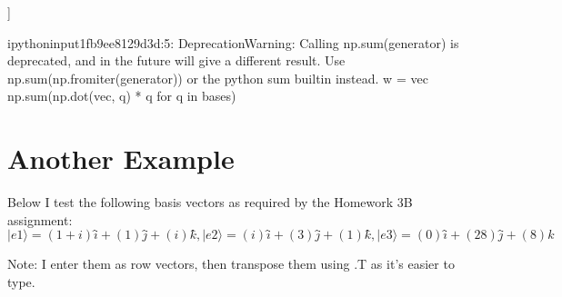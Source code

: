 \documentclass[letterpaper,10pt,english]{jupyterBook}
\begin{document}
\begin{sphinxVerbatim}[commandchars=\\\{\}]
  \PYG{p}{[}
    \PYG{p}{[}  \PYG{p}{]}
    \PYG{p}{[}  \PYG{p}{]}
    \PYG{p}{[}  \PYG{p}{]}
\PYG{p}{]}

\end{sphinxVerbatim}

\begin{sphinxVerbatim}[commandchars=\\\{\}]
[[0.57735027+0.57735027j 0.        +0.57735027j 0.        +0.j        ]
 [0.0702873 \PYGZhy{}0.05857275j 0.15228915\PYGZhy{}0.01171455j 0.98402221+0.j        ]
 [0.31547059+0.83647199j 0.32032088+0.30859935j 0.03395199\PYGZhy{}0.04243999j]]
\end{sphinxVerbatim}

\begin{sphinxVerbatim}[commandchars=\\\{\}]
\PYGZlt{}ipython\PYGZhy{}input\PYGZhy{}1\PYGZhy{}fb9ee8129d3d\PYGZgt{}:5: DeprecationWarning: Calling np.sum(generator) is deprecated, and in the future will give a different result. Use np.sum(np.fromiter(generator)) or the python sum builtin instead.
  w = vec \PYGZhy{} np.sum(np.dot(vec, q) * q for q in bases)
\end{sphinxVerbatim}


\chapter{Another Example}
\label{\detokenize{gram-schmit:another-example}}
\sphinxAtStartPar
Below I test the following basis vectors as required by the Homework 3B assignment:
\( |𝑒1⟩=(1+𝑖)𝑖̂+(1)𝑗̂+(𝑖)𝑘̂, |𝑒2⟩=(𝑖)𝑖̂+(3)𝑗̂+(1)𝑘̂, |𝑒3⟩=(0)𝑖̂+(28)𝑗̂+(8)𝑘\)

\sphinxAtStartPar
Note: I enter them as row vectors, then transpose them using .T as it’s easier to type.

\begin{sphinxVerbatim}[commandchars=\\\{\}]
  \PYG{p}{[}
    \PYG{p}{[}  \PYG{p}{]}
    \PYG{p}{[}  \PYG{p}{]}
    \PYG{p}{[}  \PYG{p}{]}
\PYG{p}{]}

\end{sphinxVerbatim}
\end{document}

